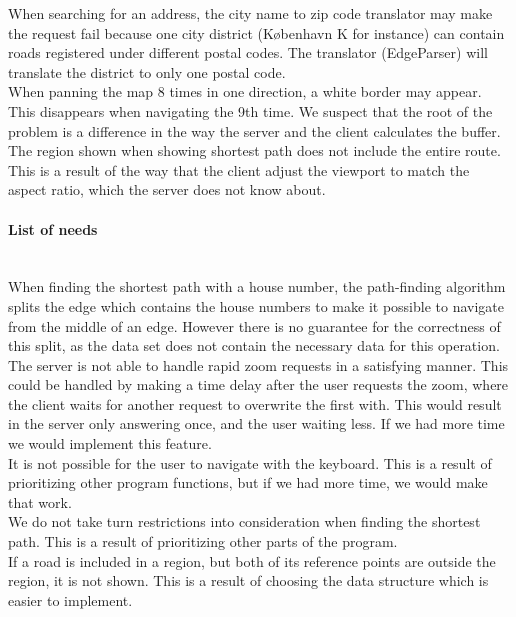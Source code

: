 \documentclass[a4paper,10pt,titlepage]{article}
\begin{document}
When searching for an address, the city name to zip code translator may make the request fail because one city district (K\o benhavn K for instance) can contain roads registered under different postal codes. The translator (EdgeParser) will translate the district to only one postal code.\\

When panning the map 8 times in one direction, a white border may appear. This disappears when navigating the 9th time. We suspect that the root of the problem is a difference in the way the server and the client calculates the buffer.\\

The region shown when showing shortest path does not include the entire route. This is a result of the way that the client adjust the viewport to match the aspect ratio, which the server does not know about.

		\paragraph{List of needs}\mbox{}\\
		
When finding the shortest path with a house number, the path-finding algorithm splits the edge which contains the house numbers to make it possible to navigate from the middle of an edge. However there is no guarantee for the correctness of this split, as the data set does not contain the necessary data for this operation.\\

The server is not able to handle rapid zoom requests in a satisfying manner. This could be handled by making a time delay after the user requests the zoom, where the client waits for another request to overwrite the first with. This would result in the server only answering once, and the user waiting less. If we had more time we would implement this feature.\\

It is not possible for the user to navigate with the keyboard. This is a result of prioritizing other program functions, but if we had more time, we would make that work.\\

We do not take turn restrictions into consideration when finding the shortest path. This is a result of prioritizing other parts of the program.\\

If a road is included in a region, but both of its reference points are outside the region, it is not shown. This is a result of choosing the data structure which is easier to implement.
			
\end{document}
